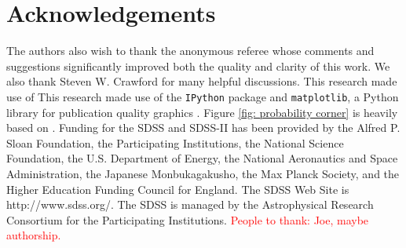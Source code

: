\documentclass[fleqn,usenatbib]{mnras}
\newcommand{\editorial}[1]{\textcolor{red}{#1}}
\begin{document}
\section*{Acknowledgements}
The authors also wish to thank the anonymous referee whose comments and suggestions significantly improved both the quality and clarity of this work. We also thank Steven W. Crawford for many helpful discussions. This research made use of This research made use of  the {\tt IPython} package \citep{Perez2007} and {\tt matplotlib}, a Python library for publication quality graphics \citep{Hunter2007}. Figure \ref{fig: probability corner} is heavily based on \cite{Foreman-Mackey2016}. Funding for the SDSS and SDSS-II has been provided by the Alfred P. Sloan Foundation, the Participating Institutions, the National Science Foundation, the U.S. Department of Energy, the National Aeronautics and Space Administration, the Japanese Monbukagakusho, the Max Planck Society, and the Higher Education Funding Council for England. The SDSS Web Site is http://www.sdss.org/. The SDSS is managed by the Astrophysical Research Consortium for the Participating Institutions. \editorial{People to thank: Joe, maybe authorship.}



%
%

\bsp	%
\label{lastpage}
\end{document}
